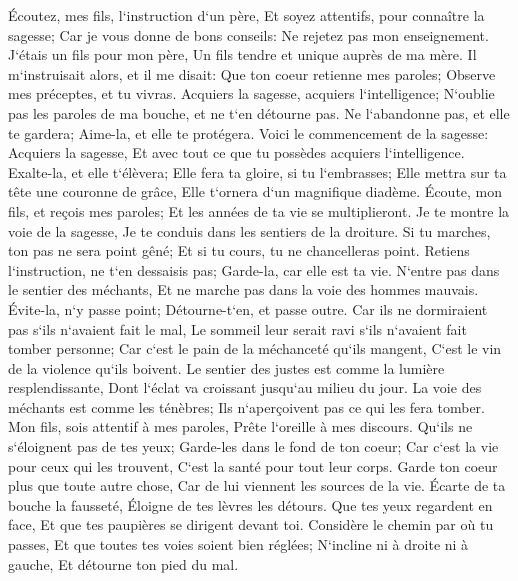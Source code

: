 \verse Écoutez, mes fils, l`instruction d`un père, Et soyez attentifs, pour connaître la sagesse; 
\verse Car je vous donne de bons conseils: Ne rejetez pas mon enseignement. 
\verse J`étais un fils pour mon père, Un fils tendre et unique auprès de ma mère. 
\verse Il m`instruisait alors, et il me disait: Que ton coeur retienne mes paroles; Observe mes préceptes, et tu vivras. 
\verse Acquiers la sagesse, acquiers l`intelligence; N`oublie pas les paroles de ma bouche, et ne t`en détourne pas. 
\verse Ne l`abandonne pas, et elle te gardera; Aime-la, et elle te protégera. 
\verse Voici le commencement de la sagesse: Acquiers la sagesse, Et avec tout ce que tu possèdes acquiers l`intelligence. 
\verse Exalte-la, et elle t`élèvera; Elle fera ta gloire, si tu l`embrasses; 
\verse Elle mettra sur ta tête une couronne de grâce, Elle t`ornera d`un magnifique diadème. 
\verse Écoute, mon fils, et reçois mes paroles; Et les années de ta vie se multiplieront. 
\verse Je te montre la voie de la sagesse, Je te conduis dans les sentiers de la droiture. 
\verse Si tu marches, ton pas ne sera point gêné; Et si tu cours, tu ne chancelleras point. 
\verse Retiens l`instruction, ne t`en dessaisis pas; Garde-la, car elle est ta vie. 
\verse N`entre pas dans le sentier des méchants, Et ne marche pas dans la voie des hommes mauvais. 
\verse Évite-la, n`y passe point; Détourne-t`en, et passe outre. 
\verse Car ils ne dormiraient pas s`ils n`avaient fait le mal, Le sommeil leur serait ravi s`ils n`avaient fait tomber personne; 
\verse Car c`est le pain de la méchanceté qu`ils mangent, C`est le vin de la violence qu`ils boivent. 
\verse Le sentier des justes est comme la lumière resplendissante, Dont l`éclat va croissant jusqu`au milieu du jour. 
\verse La voie des méchants est comme les ténèbres; Ils n`aperçoivent pas ce qui les fera tomber. 
\verse Mon fils, sois attentif à mes paroles, Prête l`oreille à mes discours. 
\verse Qu`ils ne s`éloignent pas de tes yeux; Garde-les dans le fond de ton coeur; 
\verse Car c`est la vie pour ceux qui les trouvent, C`est la santé pour tout leur corps. 
\verse Garde ton coeur plus que toute autre chose, Car de lui viennent les sources de la vie. 
\verse Écarte de ta bouche la fausseté, Éloigne de tes lèvres les détours. 
\verse Que tes yeux regardent en face, Et que tes paupières se dirigent devant toi. 
\verse Considère le chemin par où tu passes, Et que toutes tes voies soient bien réglées; 
\verse N`incline ni à droite ni à gauche, Et détourne ton pied du mal. 

